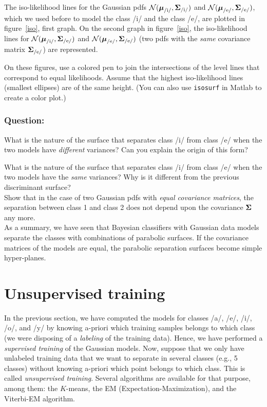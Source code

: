 \documentclass[a4paper]{article}
\newcommand{\com}[1]{{\tt #1}}
\newcommand{\tab}{\hspace{1em}}
\newcommand{\muv}{\ensuremath\boldsymbol{\mu}}  %
\newcommand{\Sm}{\ensuremath\boldsymbol{\Sigma}}  %
\begin{document}
The iso-likelihood lines for the Gaussian pdfs ${\cal
  N}(\muv_{\text{/i/}},\Sm_{\text{/i/}})$ and ${\cal
  N}(\muv_{\text{/e/}},\Sm_{\text{/e/}})$, which we used before to
model the class /i/ and the class /e/, are plotted in
figure~\ref{iso}, first graph. On the second graph in
figure~\ref{iso}, the iso-likelihood lines for ${\cal
  N}(\muv_{\text{/i/}},\Sm_{\text{/e/}})$ and ${\cal
  N}(\muv_{\text{/e/}},\Sm_{\text{/e/}})$ (two pdfs with the
\emph{same} covariance matrix $\Sm_{\text{/e/}}$) are represented.  

On these figures, use a colored pen to join the intersections of the
level lines that correspond to equal likelihoods.  Assume that the
highest iso-likelihood lines (smallest ellipses) are of the same
height. (You can also use \com{isosurf} in {\sc Matlab} to create a
color plot.)

\subsubsection{Question:}
What is the nature of the surface that separates class /i/ from class
/e/ when the two models have {\em different} variances? Can you
explain the origin of this form?

What is the nature of the surface that separates class /i/ from class
/e/ when the two models have the {\em same} variances? Why is it
different from the previous discriminant surface?
\\

Show that in the case of two Gaussian pdfs with \emph{equal covariance
  matrices}, the separation between class 1 and class 2 does not
depend upon the covariance $\Sm$ any more.
\\

\tab As a summary, we have seen that Bayesian classifiers with
Gaussian data models separate the classes with combinations of
parabolic surfaces. If the covariance matrices of the models are
equal, the parabolic separation surfaces become simple hyper-planes.



\bigskip



\section{Unsupervised training}
\label{unsup}
In the previous section, we have computed the models for classes /a/,
/e/, /i/, /o/, and /y/ by knowing a-priori which training samples
belongs to which class (we were disposing of a {\em labeling} of the
training data). Hence, we have performed a {\em supervised training}
of the Gaussian models.  Now, suppose that we only have unlabeled
training data that we want to separate in several classes (e.g., 5
classes) without knowing a-priori which point belongs to which class.
This is called {\em unsupervised training}. Several algorithms are
available for that purpose, among them: the $K$-means, the EM
(Expectation-Maximization), and the Viterbi-EM algorithm.
\end{document}
